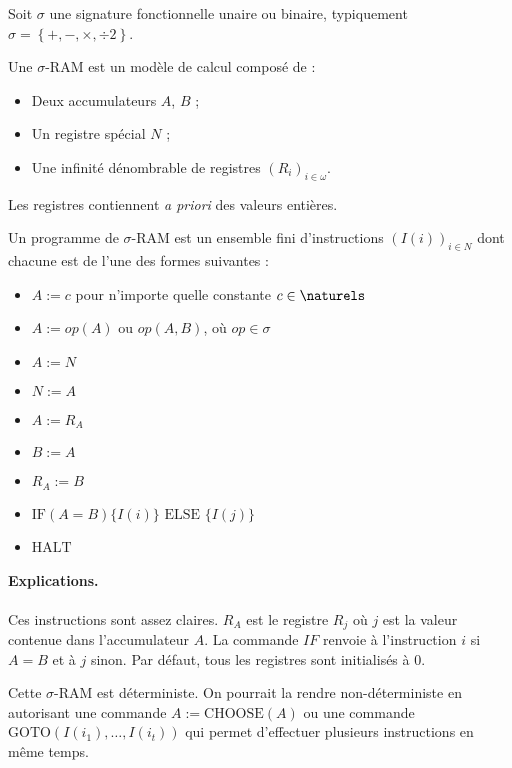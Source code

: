 \documentclass{report}
\newcommand{\sRAMif}[2]{\text{IF} (A=B) \{I( #1 )\} \text{ ELSE } \{I( #2 )\}}
\begin{document}
		
		Soit $\sigma$ une signature fonctionnelle unaire ou binaire, typiquement $\sigma = \left\lbrace +, -, \times, \div 2\right\rbrace$. 
		
		
		\begin{definition} 
			\label{def:sigma_RAM}
			
			Une $\sigma$-RAM est un modèle de calcul composé de :

			\begin{itemize}[itemsep=-1mm]
				\item	Deux accumulateurs $A$, $B$ ;
				\item 	Un registre spécial $N$ ;
				\item 	Une infinité dénombrable de registres $\left( R_i\right)_{i \in \omega}$.
			\end{itemize}
			
			Les registres contiennent \emph{a priori} des valeurs entières.
			
			Un programme de $\sigma$-RAM est un ensemble fini d'instructions $\left( I(i) \right)_{i \in N}$ dont chacune est de l'une des formes suivantes :
			
			\begin{itemize}[itemsep=-1mm]
				\item 	$A := c$ pour n'importe quelle constante $c \in \naturels$
				\item 	$A := op(A)$ ou $op(A,B)$, où $op \in \sigma$
				\item 	$A := N$ 
				\item 	$N := A$
				\item 	$A := R_A$
				\item 	$B := A$ 
				\item 	$R_A := B$
				\item 	$\sRAMif{i}{j}$
				\item 	$\text{HALT}$
			\end{itemize}	
			
			
			\paragraph{Explications.} 
			Ces instructions sont assez claires. $R_A$ est le registre $R_j$ où $j$ est la valeur contenue dans l'accumulateur $A$. La commande $IF$ renvoie à l'instruction $i$ si $A = B$ et à $j$ sinon.
			Par défaut, tous les registres sont initialisés à $0$.
			
			Cette $\sigma$-RAM est déterministe. On pourrait la rendre non-déterministe en autorisant une commande $A := \text{CHOOSE}(A)$ ou une commande $\text{GOTO}\left( I(i_1), \dots, I(i_t)\right)$ qui permet d'effectuer plusieurs instructions en même temps. 
		\end{definition}
		
\end{document}
